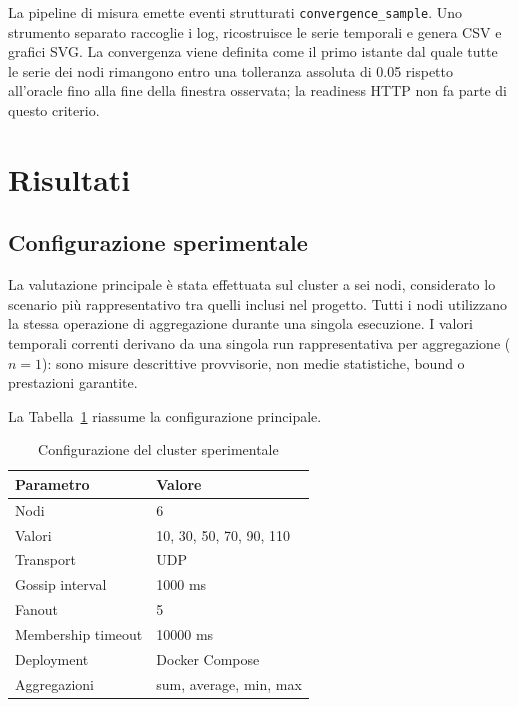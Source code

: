\documentclass[conference]{IEEEtran}
\begin{document}
La pipeline di misura emette eventi strutturati \texttt{convergence\_sample}. Uno strumento separato raccoglie i log, ricostruisce le serie temporali e genera CSV e grafici SVG. La convergenza viene definita come il primo istante dal quale tutte le serie dei nodi rimangono entro una tolleranza assoluta di 0.05 rispetto all'oracle fino alla fine della finestra osservata; la readiness HTTP non fa parte di questo criterio.

\section{Risultati}

\subsection{Configurazione sperimentale}

La valutazione principale è stata effettuata sul cluster a sei nodi, considerato lo scenario più rappresentativo tra quelli inclusi nel progetto. Tutti i nodi utilizzano la stessa operazione di aggregazione durante una singola esecuzione. I valori temporali correnti derivano da una singola run rappresentativa per aggregazione ($n=1$): sono misure descrittive provvisorie, non medie statistiche, bound o prestazioni garantite.

La Tabella~\ref{tab:setup} riassume la configurazione principale.

\begin{table}[t]
\centering
\caption{Configurazione del cluster sperimentale}
\label{tab:setup}
\footnotesize
\begin{tabular}{@{}ll@{}}
\toprule
\textbf{Parametro} & \textbf{Valore} \\
\midrule
Nodi & 6 \\
Valori & 10, 30, 50, 70, 90, 110 \\
Transport & UDP \\
Gossip interval & 1000 ms \\
Fanout & 5 \\
Membership timeout & 10000 ms \\
Deployment & Docker Compose \\
Aggregazioni & sum, average, min, max \\
\bottomrule
\end{tabular}
\end{table}
\end{document}
